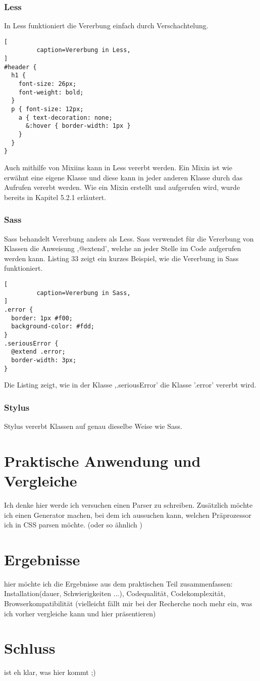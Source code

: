 \subsubsection{Less}
In Less funktioniert die Vererbung einfach durch Verschachtelung.
\begin{lstlisting}[
         caption=Vererbung in Less,
]
#header {
  h1 {
    font-size: 26px;
    font-weight: bold;
  }
  p { font-size: 12px;
    a { text-decoration: none;
      &:hover { border-width: 1px }
    }
  }
}
\end{lstlisting}
Auch mithilfe von Mixiins kann in Less vererbt werden. Ein Mixin ist wie erwähnt eine eigene Klasse und diese kann in jeder anderen Klasse durch das Aufrufen vererbt werden. Wie ein Mixin erstellt und aufgerufen wird, wurde bereits in Kapitel 5.2.1 erläutert.
\subsubsection{Sass}
Sass behandelt Vererbung anders als Less. Sass verwendet für die Vererbung von Klassen die Anweisung ,@extend', welche an jeder Stelle im Code aufgerufen werden kann. Listing 33 zeigt ein kurzes Beispiel, wie die Vererbung in Sass funktioniert.
\begin{lstlisting}[
         caption=Vererbung in Sass,
]
.error {
  border: 1px #f00;
  background-color: #fdd;
}
.seriousError {
  @extend .error;
  border-width: 3px;
}
\end{lstlisting}
Die Listing zeigt, wie in der Klasse ,.seriousError' die Klasse '.error' vererbt wird.
\subsubsection{Stylus}
Stylus vererbt Klassen auf genau dieselbe Weise wie Sass. 
\newpage
\section{Praktische Anwendung und Vergleiche}
Ich denke hier werde ich versuchen einen Parser zu schreiben. Zusätzlich möchte ich einen Generator machen, bei dem ich aussuchen kann, welchen Präprozessor ich in CSS parsen möchte. (oder so ähnlich )

\section{Ergebnisse}
hier möchte ich die Ergebnisse aus dem praktischen Teil zusammenfassen: Installation(dauer, Schwierigkeiten ...), Codequalität, Codekomplexität, Browserkompatibilität (vielleicht fällt mir bei der Recherche noch mehr ein, was ich vorher vergleiche kann und hier präsentieren)

\section{Schluss}
ist eh klar, was hier kommt ;)




